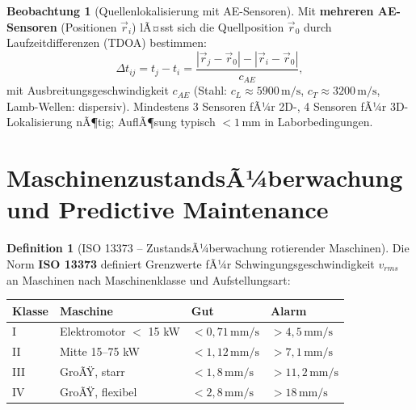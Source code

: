 ﻿\documentclass[a4paper,12pt]{report}
\theoremstyle{definition}
\newtheorem{definition}{Definition}
\newtheorem{beobachtung}{Beobachtung}
\begin{document}
\begin{beobachtung}[Quellenlokalisierung mit AE-Sensoren]
Mit \textbf{mehreren AE-Sensoren} (Positionen $\vec{r}_i$) lÃ¤sst sich
die Quellposition $\vec{r}_0$ durch Laufzeitdifferenzen (TDOA) bestimmen:
\[
  \Delta t_{ij} = t_j - t_i = \frac{|\vec{r}_j - \vec{r}_0| - |\vec{r}_i - \vec{r}_0|}{c_{AE}},
\]
mit Ausbreitungsgeschwindigkeit $c_{AE}$ (Stahl: $c_L \approx 5900\,\mathrm{m/s}$,
$c_T \approx 3200\,\mathrm{m/s}$, Lamb-Wellen: dispersiv).
Mindestens 3 Sensoren fÃ¼r 2D-, 4 Sensoren fÃ¼r 3D-Lokalisierung nÃ¶tig;
AuflÃ¶sung typisch $< 1\,\mathrm{mm}$ in Laborbedingungen.
\end{beobachtung}

\section{MaschinenzustandsÃ¼berwachung und Predictive Maintenance}

\begin{definition}[ISO 13373 -- ZustandsÃ¼berwachung rotierender Maschinen]
Die Norm \textbf{ISO 13373} definiert Grenzwerte fÃ¼r Schwingungsgeschwindigkeit
$v_{rms}$ an Maschinen nach Maschinenklasse und Aufstellungsart:
\begin{center}
\begin{tabular}{llll}
\toprule
Klasse & Maschine & Gut & Alarm \\
\midrule
I & Elektromotor $<$ 15 kW & $< 0{,}71\,\mathrm{mm/s}$ & $> 4{,}5\,\mathrm{mm/s}$ \\
II & Mitte 15--75 kW & $< 1{,}12\,\mathrm{mm/s}$ & $> 7{,}1\,\mathrm{mm/s}$ \\
III & GroÃŸ, starr & $< 1{,}8\,\mathrm{mm/s}$ & $> 11{,}2\,\mathrm{mm/s}$ \\
IV & GroÃŸ, flexibel & $< 2{,}8\,\mathrm{mm/s}$ & $> 18\,\mathrm{mm/s}$ \\
\bottomrule
\end{tabular}
\end{center}
\end{definition}
\end{document}
